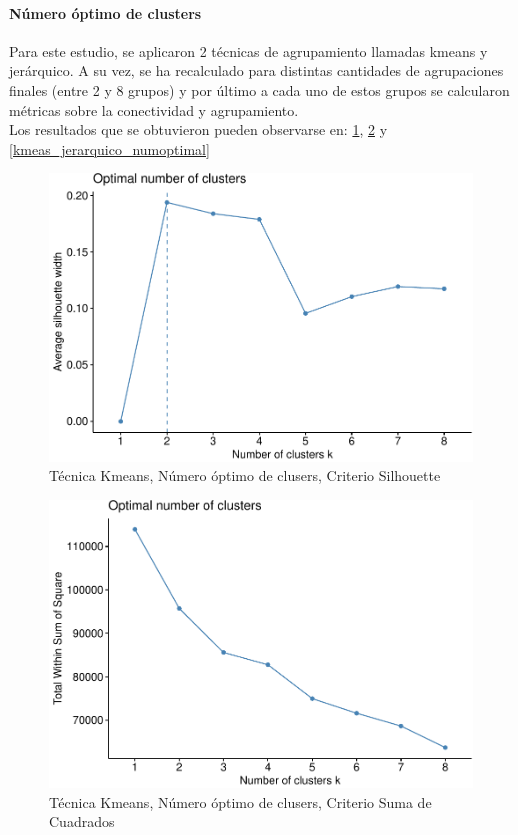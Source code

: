 \paragraph{\textbf{Número óptimo de clusters}} \label{estudio-del-numero-optimo-de-clusters}
Para este estudio, se aplicaron 2 técnicas de agrupamiento llamadas kmeans y jerárquico. A su vez, se ha recalculado para distintas cantidades de agrupaciones finales (entre 2 y 8 grupos) y por último a cada uno de estos grupos se calcularon métricas sobre la conectividad y agrupamiento.\\

Los resultados que se obtuvieron pueden observarse en: \ref{fig:kmeans_numoptimal_silhouette},  \ref{fig:kmeans_numoptimal_sumsquare} y \ref{kmeas_jerarquico_numoptimal}

\begin{figure}[!htb]
	\centering
	\includegraphics{imagenes/modelo_clusters/unnamed-chunk-15-1.pdf}
	\caption{Técnica Kmeans, Número óptimo de clusers, Criterio Silhouette}
	\label{fig:kmeans_numoptimal_silhouette}
\end{figure}

\begin{figure}[!htb]
	\centering
	\includegraphics{imagenes/modelo_clusters/unnamed-chunk-15-2.pdf}
	\caption{Técnica Kmeans, Número óptimo de clusers, Criterio Suma de Cuadrados}
	\label{fig:kmeans_numoptimal_sumsquare}
\end{figure}

